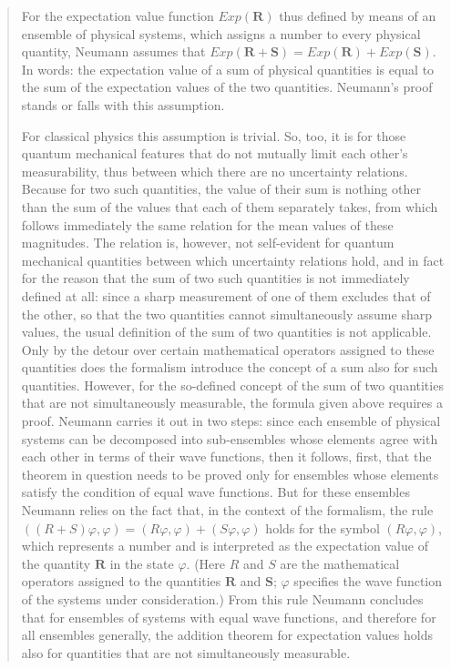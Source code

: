 \documentclass[12pt]{article}
\begin{document}
\begin{quote}
For the expectation value function $Exp(\textbf{R})$ thus defined by means of an ensemble of physical systems, which assigns a number to every physical quantity, Neumann assumes that $Exp(\textbf{R}+\textbf{S}) = Exp(\textbf{R})+Exp(\textbf{S})$. In words: the expectation value of a sum of physical quantities is equal to the sum of the expectation values of the two quantities. Neumann's proof stands or falls with this assumption.

For classical physics this assumption is trivial. So, too, it is for those quantum
mechanical features that do not mutually limit each other's measurability, thus between
which there are no uncertainty relations. Because for two such quantities, the
value of their sum is nothing other than the sum of the values that each of them
separately takes, from which follows immediately the same relation for the mean
values of these magnitudes. The relation is, however, not self-evident for quantum
mechanical quantities between which uncertainty relations hold, and in fact for the
reason that the sum of two such quantities is not immediately defined at all: since a
sharp measurement of one of them excludes that of the other, so that the two quantities
cannot simultaneously assume sharp values, the usual definition of the sum
of two quantities is not applicable. Only by the detour over certain mathematical
operators assigned to these quantities does the formalism introduce the concept of
a sum also for such quantities.
However, for the so-defined concept of the sum of two quantities that are not
simultaneously measurable, the formula given above requires a proof. Neumann carries
it out in two steps: since each ensemble of physical systems can be decomposed
into sub-ensembles whose elements agree with each other in terms of their wave
functions, then it follows, first, that the theorem in question needs to be proved only
for ensembles whose elements satisfy the condition of equal wave functions. But for
these ensembles Neumann relies on the fact that, in the context of the formalism, the
rule $((R+S)\varphi, \varphi) = (R\varphi, \varphi)+(S\varphi, \varphi)$ holds for the symbol $(R\varphi, \varphi)$, which represents
a number and is interpreted as the expectation value of the quantity $\textbf{R}$ in the state
$\varphi$. (Here $R$ and $S$ are the mathematical operators assigned to the quantities $\textbf{R}$ and
$\textbf{S}$; $\varphi$ specifies the wave function of the systems under consideration.) From this rule
Neumann concludes that for ensembles of systems with equal wave functions, and
therefore for all ensembles generally, the addition theorem for expectation values
holds also for quantities that are not simultaneously measurable.

\end{quote}
\end{document}

